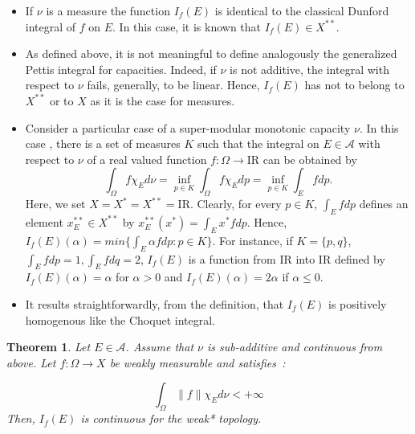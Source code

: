 \documentclass[preprint,authoryear,12pt]{article}%
\newtheorem{theorem}{Theorem}
\theoremstyle{definition}
\renewcommand{\AA}{{\mathcal A}}
\newcommand{\IR}{{\mathrm{I\!R}}}
\begin{document}
\begin{itemize} 
\item[1)] If $\nu$ is a measure the function $I_f(E)$ is identical to the classical Dunford integral of $f$ on $E$. In this case,  it is known that $I_f(E)\in X^{**}$.

\item[2)] As defined above, it is not meaningful to define analogously the generalized Pettis integral for capacities. Indeed, if $\nu$ is not additive, the integral with respect to $\nu$ fails, generally, to be linear. Hence, $I_f(E)$ has not to belong to $X^{**}$ or to $X$ as it is the case for measures. 

\item[3)] Consider a particular case of a super-modular monotonic capacity $\nu$. In this case \citep{SCH86,DEN94}, there is a set of measures $K$ such that the integral on $E\in \AA$ with respect to $\nu$ of a real valued function $f :\Omega\rightarrow \IR$ can be obtained by $$ \int_\Omega f \chi_E d\nu=\underset{p\in K}{\inf} \int_\Omega f\chi_E dp=\underset{p\in K}{\inf} \int_E f dp.$$ 
Here, we set $X=X^*=X^{**}=\IR$. Clearly, for every $p\in K$, $\int_E f d p$ defines an element $x^{**}_E\in X^{**}$ by $ x^{**}_E(x^*)=\int_Ex^* f d p$. Hence, $I_f(E)(\alpha)=min \{ \int_E \alpha f d p : p\in K\}$. For instance, if $K=\{p,q\}$, $\int_E f d p=1,\int_E f d q=2$, $I_f(E)$ is a function from $\IR$ into $\IR$ defined by $I_f(E)(\alpha)=\alpha$ for $\alpha>0$ and $I_f(E)(\alpha)=2\alpha$ if $\alpha\leq 0$.

\item[4)] It results straightforwardly, from the definition, that $I_f(E)$ is positively homogenous like the Choquet integral. 
\end{itemize}

\begin{theorem} \label{DCBT} Let $E\in \AA$. Assume that $\nu$ is sub-additive and continuous from above. Let $f:\Omega\rightarrow X$ be weakly measurable and satisfies~:

\begin{equation}\label{DCB}
\int_\Omega \|f\|\chi_E d\nu <+\infty
\end{equation}
Then,  $I_{f}(E)$ is continuous for the weak* topology. 

\end{theorem}
\end{document}
